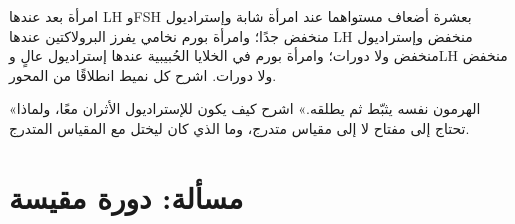 \begin{exercise}[$\star\star\star$]\label{exo:b2:reproductive-hormones:11}
امرأة بعد  عندها LH وFSH بعشرة أضعاف مستواهما عند امرأة
شابة وإستراديول منخفض جدًا؛ وامرأة بورم نخامي
يفرز البرولاكتين عندها LH منخفض وإستراديول منخفض ولا دورات؛
وامرأة بورم في الخلايا الحُبيبية عندها إستراديول عالٍ وLH منخفض
ولا دورات. اشرح كل نميط انطلاقًا من المحور.
\end{exercise}

\begin{exercise}[$\star\star\star$]\label{exo:b2:reproductive-hormones:12}
«الهرمون نفسه يثبّط  ثم يطلقه.»
اشرح كيف يكون للإستراديول الأثران معًا، ولماذا تحتاج  إلى
مفتاح لا إلى مقياس متدرج، وما الذي كان ليختل مع المقياس المتدرج.
\end{exercise}

\section{مسألة: دورة مقيسة}

